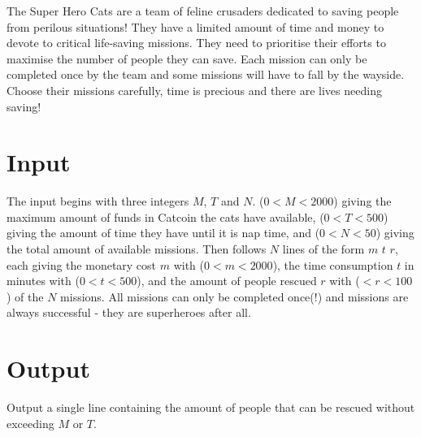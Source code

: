 


The Super Hero Cats are a team of feline crusaders dedicated to saving people from perilous situations!
They have a limited amount of time and money to devote to critical life-saving missions.
They need to prioritise their efforts to maximise the number of people they can save.
Each mission can only be completed once by the team and some missions will have to fall by the wayside.
Choose their missions carefully, time is precious and there are lives needing saving!

\section*{Input}

The input begins with three integers $M$, $T$ and $N$.
($0 < M < 2000$) giving the maximum amount of funds in Catcoin the cats have available, ($0 < T < 500$) giving the amount of time they have until it is nap time, and ($0 < N < 50$) giving the total amount of available missions.
Then follows $N$ lines of the form $m$ $t$ $r$, each giving the monetary cost $m$ with ($0 < m < 2000$), the time consumption $t$ in minutes with ($0 < t < 500$), and the amount of people rescued $r$ with ($ < r < 100$) of the $N$ missions.
All missions can only be completed once(!) and missions are always successful - they are superheroes after all.

\section*{Output}

Output a single line containing the amount of people that can be rescued without exceeding $M$ or $T$.
